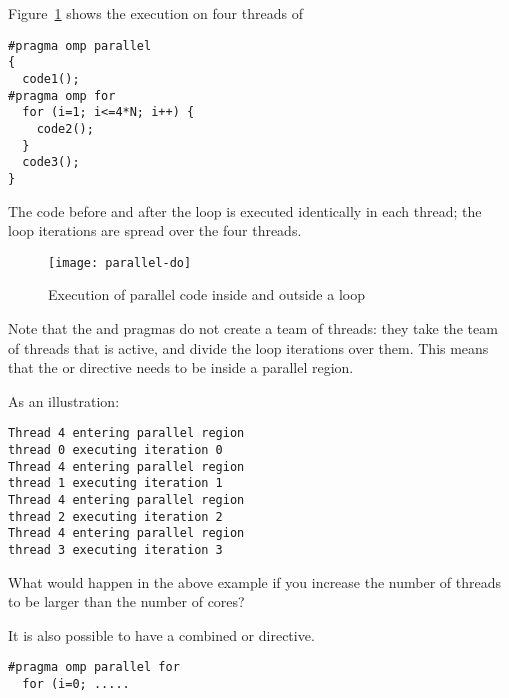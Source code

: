 Figure~\ref{fig:omp-par-do} shows the execution on four threads of
\begin{lstlisting}
#pragma omp parallel
{
  code1();
#pragma omp for
  for (i=1; i<=4*N; i++) {
    code2();
  }
  code3();
}
\end{lstlisting}
The code before and after the loop is executed identically
in each thread; the loop iterations are spread over the four threads.
\begin{figure}[ht]
  \texttt{[image: parallel-do]}
  \caption{Execution of parallel code inside and outside a loop}
  \label{fig:omp-par-do}
\end{figure}

Note that the  and 
pragmas do not create a team of threads: they
take the team of threads that is active,
and divide the loop iterations over them.
This means that the  or  directive needs to be
inside a parallel region.

As an illustration:\\
\begin{minipage}{\hsize}
  \begin{multicols}{2}
    \columnbreak
    \footnotesize
\begin{verbatim}
Thread 4 entering parallel region
thread 0 executing iteration 0
Thread 4 entering parallel region
thread 1 executing iteration 1
Thread 4 entering parallel region
thread 2 executing iteration 2
Thread 4 entering parallel region
thread 3 executing iteration 3
\end{verbatim}
  \end{multicols}
\end{minipage}

\begin{exercise}
  What would happen in the above example if you increase the number of threads
  to be larger than the number of cores?
\end{exercise}

It is also possible to have a combined
 or  directive.
\begin{lstlisting}
#pragma omp parallel for
  for (i=0; .....
\end{lstlisting}

